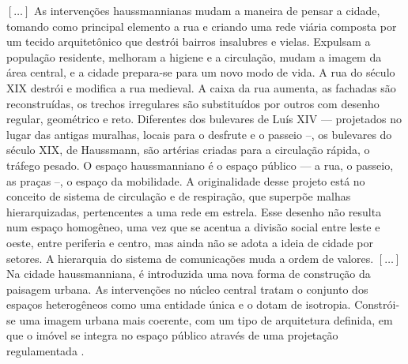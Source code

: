 \begin{citacao}
\([\dots]\) As intervenções haussmannianas mudam a maneira de pensar a cidade, tomando como principal elemento a rua e criando uma rede viária composta por um tecido arquitetônico que destrói bairros insalubres e vielas. Expulsam a população residente, melhoram a higiene e a circulação, mudam a imagem da área central, e a cidade prepara-se para um novo modo de vida. A rua do século XIX destrói e modifica a rua medieval. A caixa da rua aumenta, as fachadas são reconstruídas, os trechos irregulares são substituídos por outros com desenho regular, geométrico e reto. Diferentes dos bulevares de Luís XIV --- projetados no lugar das antigas muralhas, locais para o desfrute e o passeio --, os bulevares do século XIX, de Haussmann, são artérias criadas para a circulação rápida, o tráfego pesado. O espaço haussmanniano é o espaço público --- a rua, o passeio, as praças --, o espaço da mobilidade. A originalidade desse projeto está no conceito de sistema de circulação e de respiração, que superpõe malhas hierarquizadas, pertencentes a uma rede em estrela. Esse desenho não resulta num espaço homogêneo, uma vez que se acentua a divisão social entre leste e oeste, entre periferia e centro, mas ainda não se adota a ideia de cidade por setores. A hierarquia do sistema de comunicações muda a ordem de valores.
\([\dots]\) Na cidade haussmanniana, é introduzida uma nova forma de construção da paisagem urbana. As intervenções no núcleo central tratam o conjunto dos espaços heterogêneos como uma entidade única e o dotam de isotropia. Constrói-se uma imagem urbana mais coerente, com um tipo de arquitetura definida, em que o imóvel se integra no espaço público através de uma projetação regulamentada \cite[pp.~68,~77]{petti_eurfranba_2011}.
\end{citacao}

